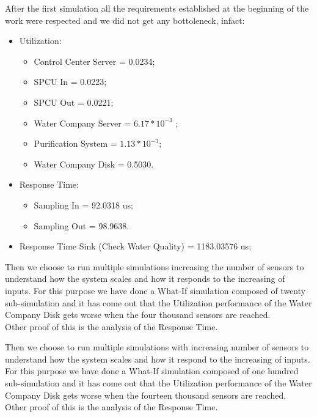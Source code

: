After the first simulation all the requirements established at the beginning of the work were respected and we did not get any bottoleneck, infact: 
\begin{itemize}
	\item Utilization:
	\begin{itemize}
		\item Control Center Server = 0.0234;
		\item SPCU In = 0.0223;
		\item SPCU Out = 0.0221;
		\item Water Company Server = $ 6.17*10^{-3}$ ;
		\item Purification System = $ 1.13*10^{-3}$;
		\item Water Company Disk = 0.5030.
	\end{itemize}
	\item Response Time:
	\begin{itemize}
		\item Sampling In = 92.0318 us;
		\item Sampling Out = 98.9638.
	\end{itemize}
	\item Response Time Sink (Check Water Quality) = 1183.03576 us;
\end{itemize}

Then we choose to run multiple simulations increasing the number of sensors to understand how the system scales and how it responds to the increasing of inputs. For this purpose we have done a What-If simulation composed of twenty sub-simulation and it has come out that the Utilization performance of the Water Company Disk gets worse when the four thousand sensors are reached.\\
Other proof of this is the analysis of the Response Time.

\begin{center}
\end{center}
\bigskip

Then we choose to run multiple simulations with increasing number of sensors to understand how the system scales and how it
respond to the increasing of inputs. For this purpose we have done a What-If simulation composed of one hundred sub-simulation and it has come out that the Utilization performance of the Water Company Disk gets worse when the fourteen thousand sensors are reached.\\
Other proof of this is the analysis of the Response Time.

